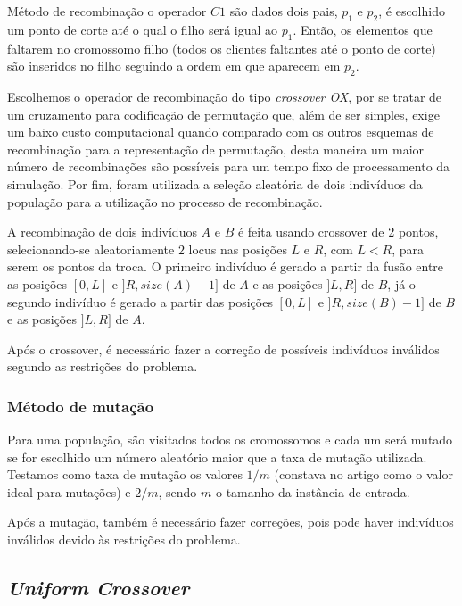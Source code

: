\documentclass[12pt,a4paper]{article}
\begin{document}
        Método de recombinação o operador $C1$ são dados dois pais, $p_1$ e $p_2$, é escolhido um ponto de corte até o qual o filho será igual ao $p_1$. Então, os elementos que faltarem no
        cromossomo filho (todos os clientes faltantes até o ponto de corte) são inseridos no filho seguindo a ordem em que aparecem em $p_2$. 

        Escolhemos o operador de recombinação do tipo \emph{crossover OX}, por se tratar de um cruzamento para codificação de permutação que, além de ser simples, exige um baixo custo computacional
        quando comparado com os outros esquemas de recombinação para a representação de permutação, desta maneira um maior número de recombinações são possíveis para um tempo fixo de processamento
        da simulação. Por fim, foram utilizada a seleção aleatória de dois indivíduos da população para a utilização no processo de recombinação.

        A recombinação de dois indivíduos $A$ e $B$ é feita usando crossover de 2 pontos, selecionando-se aleatoriamente $2$ locus nas posições $L$ e $R$, com $L < R$, para serem os pontos da troca.
        O primeiro indivíduo é gerado a partir da fusão entre as posições $[0, L]$ e $]R, size(A) - 1]$ de $A$ e as posições $]L, R]$ de $B$, já o segundo indivíduo é gerado a partir das posições
        $[0, L]$ e $]R, size(B) - 1]$ de $B$ e as posições $]L, R]$ de $A$.

        Após o crossover, é necessário fazer a correção de possíveis indivíduos inválidos segundo as restrições do problema.

    \subsubsection{Método de mutação}

         Para uma população, são visitados todos os cromossomos e cada um será mutado se for escolhido um número aleatório maior que a taxa de mutação utilizada. Testamos como taxa de
         mutação os valores $1/m$ (constava no artigo como o valor ideal para mutações) e $2/m$, sendo $m$ o tamanho da instância de entrada.

        Após a mutação, também é necessário fazer correções, pois pode haver indivíduos inválidos devido às restrições do problema.

    \subsection{\textit{Uniform Crossover}}
\end{document}

